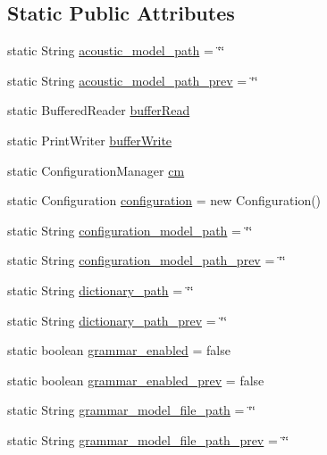 \subsection*{Static Public Attributes}
\begin{DoxyCompactItemize}
\item 
static String \hyperlink{classSphinx4_a675a67b1705cd6ec01bb1e9447d588d4}{acoustic\-\_\-model\-\_\-path} = \char`\"{}\char`\"{}
\item 
static String \hyperlink{classSphinx4_a63b3cf1a9479a86d69526b34e3975b8c}{acoustic\-\_\-model\-\_\-path\-\_\-prev} = \char`\"{}\char`\"{}
\item 
static Buffered\-Reader \hyperlink{classSphinx4_a60e71ecb19da1d08a0c2d71b0f6ac875}{buffer\-Read}
\item 
static Print\-Writer \hyperlink{classSphinx4_aa3a9b95c9245e791f4d8e04b157372ca}{buffer\-Write}
\item 
static Configuration\-Manager \hyperlink{classSphinx4_a227104f3b942fde3f279ee54a700772d}{cm}
\item 
static Configuration \hyperlink{classSphinx4_adad3fb0b68649c440cabe47895a53e27}{configuration} = new Configuration()
\item 
static String \hyperlink{classSphinx4_aa403d02afb54d7c774c4ec53770a567c}{configuration\-\_\-model\-\_\-path} = \char`\"{}\char`\"{}
\item 
static String \hyperlink{classSphinx4_aaa4c30258a2c98605fc05ab3e50c20ca}{configuration\-\_\-model\-\_\-path\-\_\-prev} = \char`\"{}\char`\"{}
\item 
static String \hyperlink{classSphinx4_a1c5ef308a94ee2d15c6856c676206ba4}{dictionary\-\_\-path} = \char`\"{}\char`\"{}
\item 
static String \hyperlink{classSphinx4_a3c079ed40372dcc0cda65345cda22325}{dictionary\-\_\-path\-\_\-prev} = \char`\"{}\char`\"{}
\item 
static boolean \hyperlink{classSphinx4_a20f0d9d8646e97cd64d675957eb0a8ec}{grammar\-\_\-enabled} = false
\item 
static boolean \hyperlink{classSphinx4_a3830508de85cfcde2b71c019b9b645da}{grammar\-\_\-enabled\-\_\-prev} = false
\item 
static String \hyperlink{classSphinx4_a3913defdceb57d6ecd4dca0e2d83f4b9}{grammar\-\_\-model\-\_\-file\-\_\-path} = \char`\"{}\char`\"{}
\item 
static String \hyperlink{classSphinx4_aed95605805711285385e0baa12c5d1dd}{grammar\-\_\-model\-\_\-file\-\_\-path\-\_\-prev} = \char`\"{}\char`\"{}

\end{DoxyCompactItemize}
